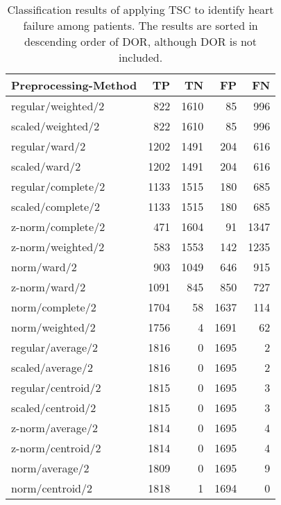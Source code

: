 \begin{longtable}{lrrrr}
    \caption{Classification results of applying TSC to identify heart failure among patients.
             The results are sorted in descending order of DOR, although DOR is not included.}
    \label{tab:tsc_segm_ind_raw_results}\\
    \hline
    Preprocessing-Method &  TP  &  TN  &  FP  &  FN  \\
    \hline
    regular/weighted/2   &  822 & 1610 &   85 &  996 \\
    scaled/weighted/2    &  822 & 1610 &   85 &  996 \\
    regular/ward/2       & 1202 & 1491 &  204 &  616 \\
    scaled/ward/2        & 1202 & 1491 &  204 &  616 \\
    regular/complete/2   & 1133 & 1515 &  180 &  685 \\
    scaled/complete/2    & 1133 & 1515 &  180 &  685 \\
    z-norm/complete/2    &  471 & 1604 &   91 & 1347 \\
    z-norm/weighted/2    &  583 & 1553 &  142 & 1235 \\
    norm/ward/2          &  903 & 1049 &  646 &  915 \\
    z-norm/ward/2        & 1091 &  845 &  850 &  727 \\
    norm/complete/2      & 1704 &   58 & 1637 &  114 \\
    norm/weighted/2      & 1756 &    4 & 1691 &   62 \\
    regular/average/2    & 1816 &    0 & 1695 &    2 \\
    scaled/average/2     & 1816 &    0 & 1695 &    2 \\
    regular/centroid/2   & 1815 &    0 & 1695 &    3 \\
    scaled/centroid/2    & 1815 &    0 & 1695 &    3 \\
    z-norm/average/2     & 1814 &    0 & 1695 &    4 \\
    z-norm/centroid/2    & 1814 &    0 & 1695 &    4 \\
    norm/average/2       & 1809 &    0 & 1695 &    9 \\
    norm/centroid/2      & 1818 &    1 & 1694 &    0 \\
    \hline
\end{longtable}
